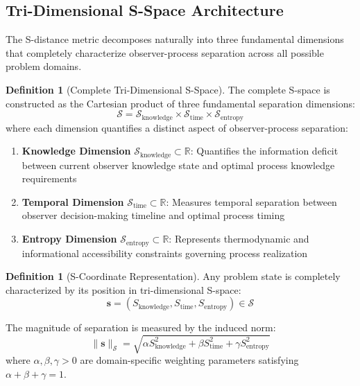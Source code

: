 \documentclass[11pt]{article}
\theoremstyle{definition}
\newtheorem{definition}[theorem]{Definition}
\theoremstyle{remark}
\newcommand{\Real}{\mathbb{R}}
\newcommand{\SEntropy}{\mathcal{S}}
\newcommand{\SKnowledge}{\mathcal{S}_{\text{knowledge}}}
\newcommand{\STime}{\mathcal{S}_{\text{time}}}
\newcommand{\SSpace}{\mathcal{S}_{\text{entropy}}}
\begin{document}
\subsection{Tri-Dimensional S-Space Architecture}

The S-distance metric decomposes naturally into three fundamental dimensions that completely characterize observer-process separation across all possible problem domains.

\begin{definition}[Complete Tri-Dimensional S-Space]
The complete S-space is constructed as the Cartesian product of three fundamental separation dimensions:
\begin{equation}
\SEntropy = \SKnowledge \times \STime \times \SSpace
\end{equation}
where each dimension quantifies a distinct aspect of observer-process separation:

\begin{enumerate}
\item \textbf{Knowledge Dimension} $\SKnowledge \subset \Real$: Quantifies the information deficit between current observer knowledge state and optimal process knowledge requirements
\item \textbf{Temporal Dimension} $\STime \subset \Real$: Measures temporal separation between observer decision-making timeline and optimal process timing
\item \textbf{Entropy Dimension} $\SSpace \subset \Real$: Represents thermodynamic and informational accessibility constraints governing process realization
\end{enumerate}
\end{definition}

\begin{definition}[S-Coordinate Representation]
Any problem state is completely characterized by its position in tri-dimensional S-space:
\begin{equation}
\mathbf{s} = (S_{\text{knowledge}}, S_{\text{time}}, S_{\text{entropy}}) \in \SEntropy
\end{equation}

The magnitude of separation is measured by the induced norm:
\begin{equation}
\|\mathbf{s}\|_{\SEntropy} = \sqrt{\alpha S_{\text{knowledge}}^2 + \beta S_{\text{time}}^2 + \gamma S_{\text{entropy}}^2}
\end{equation}
where $\alpha, \beta, \gamma > 0$ are domain-specific weighting parameters satisfying $\alpha + \beta + \gamma = 1$.
\end{definition}
\end{document}
